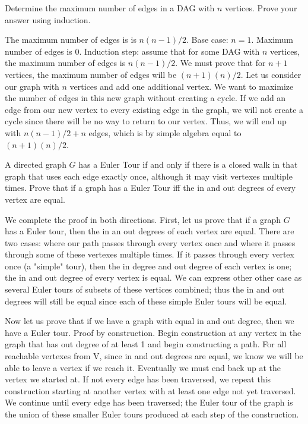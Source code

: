 \documentclass[solution, letterpaper]{cs20}
\begin{document}



\subproblem Determine the maximum number of edges in a DAG with $n$ vertices.
\subproblem Prove your answer using induction.  

\begin{solution}
\subsolution The maximum number of edges is is $n(n-1)/2$. 
\subsolution Base case: $n = 1$. Maximum number of edges is 0. 
Induction step: assume that for some DAG with $n$ vertices, the maximum number of edges is $n(n-1)/2$. We must prove that for $n+1$ vertices, the maximum number of edges will be $(n+1)(n)/2$. Let us consider our graph with $n$ vertices and add one additional vertex.  We want to maximize the number of edges in this new graph without creating a cycle. If we add an edge from our new vertex to every existing edge in the graph, we will not create a cycle since there will be no way to return to our vertex. Thus, we will end up with $n(n-1)/2 + n$ edges, which is by simple algebra equal to $(n+1)(n)/2$. 
\end{solution}


A directed graph $G$ has a Euler Tour if and only if there is a closed walk in that graph that uses each edge exactly once, although it may visit vertexes multiple times. Prove that if a graph has a Euler Tour iff the in and out degrees of every vertex are equal. 

\begin{solution}
We complete the proof in both directions. First, let us prove that if a graph $G$ has a Euler tour, then the in an out degrees of each vertex are equal. There are two cases: where our path passes through every vertex once and where it passes through some of these vertexes multiple times. If it passes through every vertex once (a "simple" tour), then the in degree and out degree of each vertex is one; the in and out degree of every vertex is equal. We can express other other case as several Euler tours of subsets of these vertices combined; thus the in and out degrees will still be equal since each of these simple Euler tours will be equal. 

Now let us prove that if we have a graph with equal in and out degree, then we have a Euler tour. Proof by construction. Begin construction at any vertex in the graph that has out degree of at least 1 and begin constructing a path. For all reachable vertexes from V, since in and out degrees are equal, we know we will be able to leave a vertex if we reach it. Eventually we must end back up at the vertex we started at. If not every edge has been traversed, we repeat this construction starting at another vertex with at least one edge not yet traversed. We continue until every edge has been traversed; the Euler tour of the graph is the union of these smaller Euler tours produced at each step of the construction. 

\end{solution}
\end{document}
